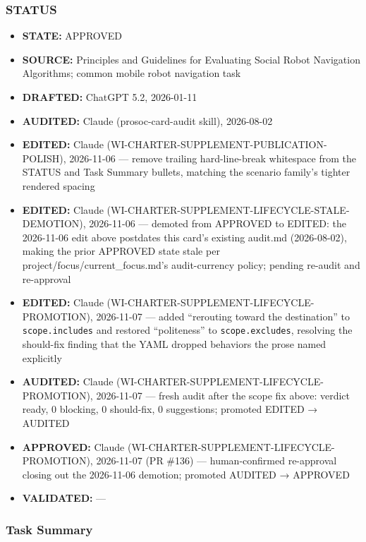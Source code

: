 \documentclass[utf8]{frontiers_suppmat} %
\providecommand{\tightlist}{%
  \setlength{\itemsep}{0pt}\setlength{\parskip}{0pt}}
\begin{document}
\subsubsection{STATUS}\label{status}

\begin{itemize}
\tightlist
\item
  \textbf{STATE:} APPROVED
\item
  \textbf{SOURCE:} Principles and Guidelines for Evaluating Social Robot
  Navigation Algorithms; common mobile robot navigation task
\item
  \textbf{DRAFTED:} ChatGPT 5.2, 2026-01-11
\item
  \textbf{AUDITED:} Claude (prosoc-card-audit skill), 2026-08-02
\item
  \textbf{EDITED:} Claude (WI-CHARTER-SUPPLEMENT-PUBLICATION-POLISH),
  2026-11-06 --- remove trailing hard-line-break whitespace from the
  STATUS and Task Summary bullets, matching the scenario family's
  tighter rendered spacing
\item
  \textbf{EDITED:} Claude
  (WI-CHARTER-SUPPLEMENT-LIFECYCLE-STALE-DEMOTION), 2026-11-06 ---
  demoted from APPROVED to EDITED: the 2026-11-06 edit above postdates
  this card's existing audit.md (2026-08-02), making the prior APPROVED
  state stale per project/focus/current\_focus.md's audit-currency
  policy; pending re-audit and re-approval
\item
  \textbf{EDITED:} Claude (WI-CHARTER-SUPPLEMENT-LIFECYCLE-PROMOTION),
  2026-11-07 --- added ``rerouting toward the destination'' to
  \texttt{scope.includes} and restored ``politeness''
  to \texttt{scope.excludes}, resolving the should-fix
  finding that the YAML dropped behaviors the prose named explicitly
\item
  \textbf{AUDITED:} Claude (WI-CHARTER-SUPPLEMENT-LIFECYCLE-PROMOTION),
  2026-11-07 --- fresh audit after the scope fix above: verdict ready, 0
  blocking, 0 should-fix, 0 suggestions; promoted EDITED → AUDITED
\item
  \textbf{APPROVED:} Claude (WI-CHARTER-SUPPLEMENT-LIFECYCLE-PROMOTION),
  2026-11-07 (PR \#136) --- human-confirmed re-approval closing out the
  2026-11-06 demotion; promoted AUDITED → APPROVED
\item
  \textbf{VALIDATED:} ---
\end{itemize}

\subsubsection{Task Summary}\label{task-summary}
\end{document}
